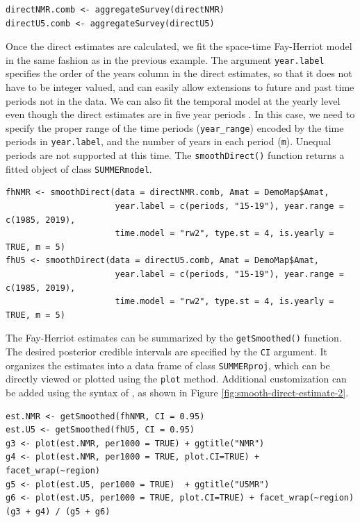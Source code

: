 \begin{verbatim}
directNMR.comb <- aggregateSurvey(directNMR)
directU5.comb <- aggregateSurvey(directU5)
\end{verbatim}

Once the direct estimates are calculated, we fit the space-time Fay-Herriot model in the same fashion as in the previous example. The argument \texttt{year.label} specifies the order of the years column in the direct estimates, so that it does not have to be integer valued, and can easily allow extensions to future and past time periods not in the data. We can also fit the temporal model at the yearly level even though the direct estimates are in five year periods \citep{li_etal_19}. In this case, we need to specify the proper range of the time periods (\texttt{year\_range}) encoded by the time periods in \texttt{year.label}, and the number of years in each period (\texttt{m}). Unequal periods are not supported at this time. The \texttt{smoothDirect()} function returns a fitted object of class \texttt{SUMMERmodel}.

\begin{verbatim}
fhNMR <- smoothDirect(data = directNMR.comb, Amat = DemoMap$Amat, 
                      year.label = c(periods, "15-19"), year.range = c(1985, 2019), 
                      time.model = "rw2", type.st = 4, is.yearly = TRUE, m = 5)
fhU5 <- smoothDirect(data = directU5.comb, Amat = DemoMap$Amat, 
                      year.label = c(periods, "15-19"), year.range = c(1985, 2019), 
                      time.model = "rw2", type.st = 4, is.yearly = TRUE, m = 5)
\end{verbatim}

The Fay-Herriot estimates can be summarized by the \texttt{getSmoothed()} function. The desired posterior credible intervals are specified by the \texttt{CI} argument. It organizes the estimates into a data frame of class \texttt{SUMMERproj}, which can be directly viewed or plotted using the \texttt{plot} method. Additional customization can be added using the syntax of , as shown in Figure \ref{fig:smooth-direct-estimate-2}.

\begin{verbatim}
est.NMR <- getSmoothed(fhNMR, CI = 0.95)
est.U5 <- getSmoothed(fhU5, CI = 0.95)
g3 <- plot(est.NMR, per1000 = TRUE) + ggtitle("NMR")
g4 <- plot(est.NMR, per1000 = TRUE, plot.CI=TRUE) + facet_wrap(~region)
g5 <- plot(est.U5, per1000 = TRUE)  + ggtitle("U5MR")
g6 <- plot(est.U5, per1000 = TRUE, plot.CI=TRUE) + facet_wrap(~region)
(g3 + g4) / (g5 + g6)
\end{verbatim}


